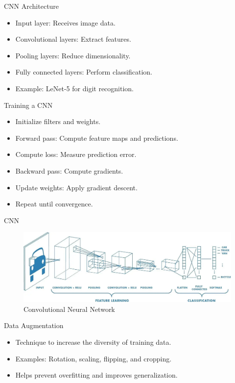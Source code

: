 \documentclass{beamer}
\begin{document}
\begin{frame}{CNN Architecture}
    \begin{itemize}
        \item Input layer: Receives image data.
        \item Convolutional layers: Extract features.
        \item Pooling layers: Reduce dimensionality.
        \item Fully connected layers: Perform classification.
        \item Example: LeNet-5 for digit recognition.
    \end{itemize}
\end{frame}

\begin{frame}{Training a CNN}
    \begin{itemize}
        \item Initialize filters and weights.
        \item Forward pass: Compute feature maps and predictions.
        \item Compute loss: Measure prediction error.
        \item Backward pass: Compute gradients.
        \item Update weights: Apply gradient descent.
        \item Repeat until convergence.
    \end{itemize}
\end{frame}

\begin{frame}{CNN}
    \begin{figure}
        \centering
        \includegraphics[width=1\textwidth]{cnn.png}
        \caption{Convolutional Neural Network}
    \end{figure}
\end{frame}

\begin{frame}{Data Augmentation}
    \begin{itemize}
        \item Technique to increase the diversity of training data.
        \item Examples: Rotation, scaling, flipping, and cropping.
        \item Helps prevent overfitting and improves generalization.
    \end{itemize}
\end{frame}
\end{document}
